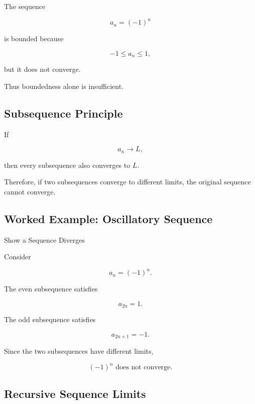 The sequence

\[
\boxed{
a_n=(-1)^n
}
\]

is bounded because

\[
-1\leq a_n\leq1,
\]

but it does not converge.

Thus boundedness alone is insufficient.

\subsection{Subsequence Principle}
\label{subsec:subsequence-limit-principle}

If

\[
a_n\to L,
\]

then every subsequence also converges to \(L\).

Therefore, if two subsequences converge to different limits, the original
sequence cannot converge.

\subsection{Worked Example: Oscillatory Sequence}
\label{subsec:worked-oscillatory-sequence}

\begin{workedexamplebox}{Show a Sequence Diverges}

Consider

\[
a_n=(-1)^n.
\]

The even subsequence satisfies

\[
a_{2n}=1.
\]

The odd subsequence satisfies

\[
a_{2n+1}=-1.
\]

Since the two subsequences have different limits,

\begin{answerbox}
\[
\boxed{
(-1)^n
\text{ does not converge}.
}
\]
\end{answerbox}

\end{workedexamplebox}

\subsection{Recursive Sequence Limits}
\label{subsec:recursive-sequence-limits}

